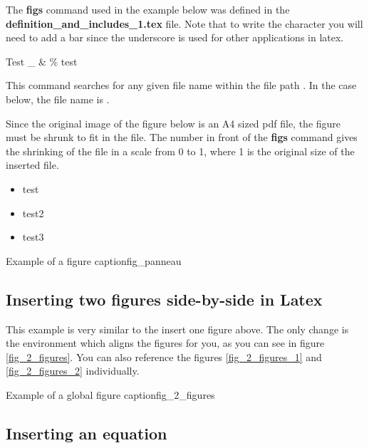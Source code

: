 	The \textbf{figs} command used in the example below was defined in the \textbf{definition\_and\_includes\_1.tex} file.
	Note that to write the character \dbquote{\_} you will need to add a bar since the underscore is used for other applications in latex.
	
	Test \_ \& \* \% test	
	
	This command searches for any given file name within the file path .
	In the case below, the file name is .
	
	Since the original image of the figure below is an A4 sized pdf file, the figure must be shrunk to fit in the file.
	The number in front of the \textbf{figs} command gives the shrinking of the file in a scale from 0 to 1, 
	where 1 is the original size of the inserted file.  
	
	\begin{itemize}
		\item test
		\item test2
		\item test3
	\end{itemize}
	
	
	\begin{myfigure}{Example of a figure caption}{fig_panneau}    
	\end{myfigure}		
	
	
	\subsection{Inserting two figures side-by-side in Latex}
	
	This example is very similar to the insert one figure above.
	The only change is the  environment which aligns the figures for you, as you can see in figure \ref{fig_2_figures}.
	You can also reference the figures \ref{fig_2_figures_1} and \ref{fig_2_figures_2} individually. 
	
	\begin{myfigure}{Example of a global figure caption}{fig_2_figures}    
		\mbox{	
		} \\
	\end{myfigure}		
	
	
	\subsection{Inserting an equation}
	
